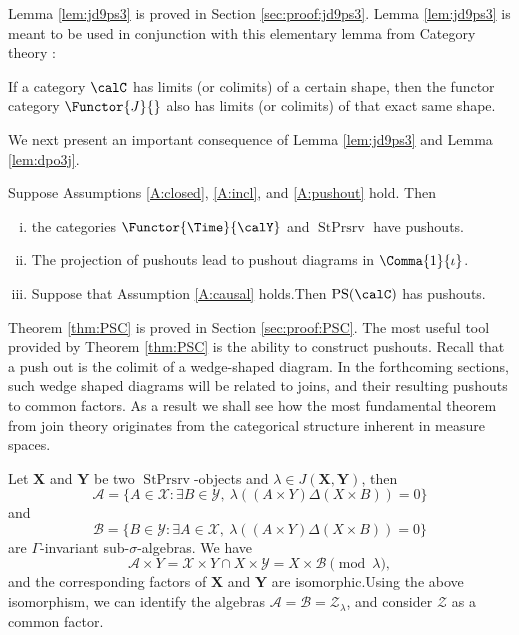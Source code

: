 \documentclass[12pt,oneside,pb-diagram]{article}
\DeclareMathOperator{\sps}{StPrsrv}
\begin{document}
Lemma \ref{lem:jd9ps3} is proved in Section \ref{sec:proof:jd9ps3}. Lemma \ref{lem:jd9ps3} is meant to be used in conjunction with this elementary lemma from Category theory :

\begin{lemma}  \label{lem:dpo3j}
	If a category $\calC$ has limits (or colimits) of a certain shape, then the functor category $\Functor{J}{\cal}$ also has limits (or colimits) of that exact same shape.
\end{lemma}


We next present an important consequence of Lemma \ref{lem:jd9ps3} and Lemma \ref{lem:dpo3j}.

\begin{theorem} \label{thm:PSC}
	Suppose Assumptions \ref{A:closed}, \ref{A:incl}, and \ref{A:pushout} hold. Then 
	\begin{enumerate} [(i)]
		\item the categories $\Functor{\Time}{\calY}$ and $\sps$ have pushouts.
		\item The projection of pushouts lead to pushout diagrams in $\Comma{1}{\iota}$.
		\item Suppose that Assumption \ref{A:causal} holds.Then  $\text{PS}(\calC)$ has pushouts.
	\end{enumerate}
\end{theorem}

Theorem \ref{thm:PSC} is proved in Section \ref{sec:proof:PSC}. The most useful tool provided by Theorem \ref{thm:PSC} is the ability to construct pushouts. Recall that a push out is the colimit of a wedge-shaped diagram. In the forthcoming sections, such wedge shaped diagrams will be related to joins, and their resulting pushouts to common factors. As a result we shall see how the most fundamental theorem from join theory originates from the categorical structure inherent in measure spaces.

\begin{Erg}{}{} 
	\cite[Thm 6.6]{glasner2015join} Let $\mathbf{X}$ and $\mathbf{Y}$ be two $\sps$-objects and $\lambda \in J(\mathbf{X}, \mathbf{Y})$, then$$\mathcal{A} = \{A \in \mathcal{X} : \exists B \in \mathcal{Y}, \ \lambda((A \times Y) \Delta (X \times B)) = 0\}$$and$$\mathcal{B} = \{B \in \mathcal{Y} : \exists A \in \mathcal{X}, \ \lambda((A \times Y) \Delta (X \times B)) = 0\}$$are $\Gamma$-invariant sub-$\sigma$-algebras. We have$$\mathcal{A} \times Y = \mathcal{X} \times Y \cap X \times \mathcal{Y} = X \times \mathcal{B} \pmod \lambda,$$and the corresponding factors of $\mathbf{X}$ and $\mathbf{Y}$ are isomorphic.Using the above isomorphism, we can identify the algebras $\mathcal{A} = \mathcal{B} = \mathcal{Z}_\lambda$, and consider $\mathcal{Z}$ as a common factor. 
\end{Erg}
\end{document}
